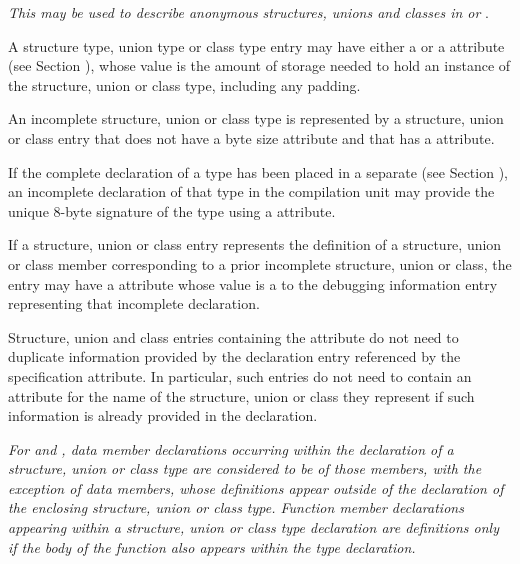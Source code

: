 \textit{This may be used to describe anonymous structures, unions 
and classes in  or }.

A\hypertarget{chap:DWATbitsizedatamemberbitsize}{} 
structure type, union type or class type entry may have
either a \DWATbytesize{} or a \DWATbitsize{} attribute 
(see Section ), 
whose value is the amount of storage needed
to hold an instance of the structure, union or class type,
including any padding.
  
An incomplete structure, union or class type 
is represented by a structure, union or class
entry that does not have a byte size attribute and that has
a \DWATdeclaration{} attribute.

If the complete declaration of a type has been placed 
in\hypertarget{chap:DWATsignaturetypesignature}{}
a separate 
(see Section ), 
an incomplete declaration 
of that type in the compilation unit may provide
the unique 8-byte signature of the type using a
\DWATsignatureDEFN{} attribute.

If a structure, union or class entry represents the definition
of a structure, union or class member corresponding to a prior
incomplete structure, union or class, the entry may have a
\DWATspecification{} attribute 
whose value is a  to
the debugging information entry representing that incomplete
declaration.

Structure, union and class entries containing the
\DWATspecification{} attribute 
do not need to duplicate
information provided by the declaration entry referenced by the
specification attribute.  In particular, such entries do not
need to contain an attribute for the name of the structure,
union or class they represent if such information is already
provided in the declaration.

\textit{For  and , 
data 
member declarations occurring within
the declaration of a structure, union or class type are
considered to be  of those members, with
the exception of  data members, whose definitions
appear outside of the declaration of the enclosing structure,
union or class type. Function member declarations appearing
within a structure, union or class type declaration are
definitions only if the body of the function also appears
within the type declaration.}

